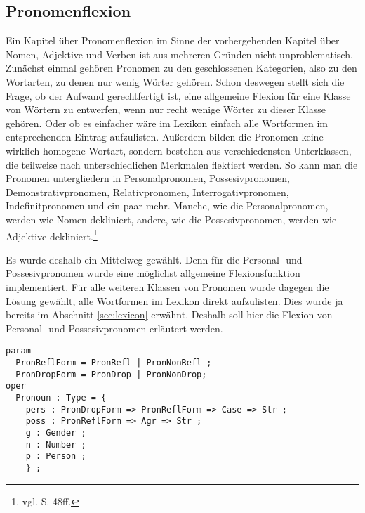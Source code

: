 \subsection{Pronomenflexion}
\label{subsec:pronomen}
Ein Kapitel über Pronomenflexion im Sinne der vorhergehenden Kapitel über Nomen, Adjektive und Verben ist aus mehreren Gründen nicht unproblematisch. Zunächst einmal gehören Pronomen zu den geschlossenen Kategorien, also zu den Wortarten, zu denen nur wenig Wörter gehören. Schon deswegen stellt sich die Frage, ob der Aufwand gerechtfertigt ist, eine allgemeine Flexion für eine Klasse von Wörtern zu entwerfen, wenn nur recht wenige Wörter zu dieser Klasse gehören. Oder ob es einfacher wäre im Lexikon einfach alle Wortformen im entsprechenden Eintrag aufzulisten. Außerdem bilden die Pronomen keine wirklich homogene Wortart, sondern bestehen aus verschiedensten Unterklassen, die teilweise nach unterschiedlichen Merkmalen flektiert werden. So kann man die Pronomen untergliedern in Personalpronomen, Possesivpronomen, Demonstrativpronomen, Relativpronomen, Interrogativpronomen, Indefinitpronomen und ein paar mehr. Manche, wie die Personalpronomen, werden wie Nomen dekliniert, andere, wie die Possesivpronomen, werden wie Adjektive dekliniert.\footnote{vgl. \cite{BAYER-LINDAUER1994} S. 48ff.} \par
Es wurde deshalb ein Mittelweg gewählt. Denn für die Personal- und Possesivpronomen wurde eine möglichst allgemeine Flexionsfunktion implementiert. Für alle weiteren Klassen von Pronomen wurde dagegen die Lösung gewählt, alle Wortformen im Lexikon direkt aufzulisten. Dies wurde ja bereits im Abschnitt \ref{sec:lexicon} erwähnt. Deshalb soll hier die Flexion von Personal- und Possesivpronomen erläutert werden. \par
\begin{lstlisting}[float=h!tp,caption={Typ für Pronomen (vgl. \textbf{ResLat.gf})},label={GF-Res-Pronoun},basicstyle=\small]
param
  PronReflForm = PronRefl | PronNonRefl ;
  PronDropForm = PronDrop | PronNonDrop;
oper
  Pronoun : Type = {
    pers : PronDropForm => PronReflForm => Case => Str ;
    poss : PronReflForm => Agr => Str ;
    g : Gender ;
    n : Number ;
    p : Person ;
    } ;
\end{lstlisting}
